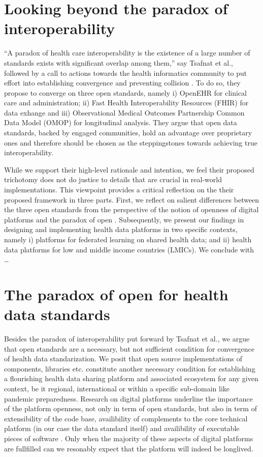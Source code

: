 \documentclass[
  authoryear]{elsarticle}
\begin{document}
\section{Looking beyond the paradox of
interoperability}\label{looking-beyond-the-paradox-of-interoperability}

``A paradox of health care interoperability is the existence of a large
number of standards exists with significant overlap among them,'' say
Tsafnat et al., followed by a call to actions towards the health
informatics community to put effort into establishing convergence and
preventing collision \citep{tsafnat2024converge}. To do so, they propose
to converge on three open standards, namely i) OpenEHR for clinical care
and administration; ii) Fast Health Interoperability Resources (FHIR)
for data exhange and iii) Observational Medical Outcomes Partnership
Common Data Model (OMOP) for longitudinal analysis. They argue that open
data standards, backed by engaged communities, hold an advantage over
proprietary ones and therefore should be chosen as the steppingstones
towards achieving true interoperability.

While we support their high-level rationale and intention, we feel their
proposed trichotomy does not do justice to details that are crucial in
real-world implementations. This viewpoint provides a critical
reflection on the their proposed framework in three parts. First, we
reflect on salient differences between the three open standards from the
perspective of the notion of openness of digital platforms
\citep{dereuver2018digital} and the paradox of open
\citep{keller2021paradox}. Subsequently, we present our findings in
designing and implementing health data platforms in two specific
contexts, namely i) platforms for federated learning on shared health
data; and ii) health data platforms for low and middle income countries
(LMICs). We conclude with \ldots{}

\section{The paradox of open for health data
standards}\label{the-paradox-of-open-for-health-data-standards}

Besides the paradox of interoperability put forward by Tsafnat et al.,
we argue that open standards are a necessary, but not sufficient
condition for convergence of health data standarization. We posit that
open source implementations of components, libraries etc. constitute
another necessary condition for establishing a flourishing health data
sharing platform and associated ecosystem for any given context, be it
regional, international or within a specific sub-domain like pandemic
preparedness. Research on digital platforms underline the importance of
the platform openness, not only in term of open standards, but also in
term of extensibility of the code base, availibility of complements to
the core technical platform (in our case the data standard itself) and
availibility of executable pieces of software
\citep{dereuver2018digital}. Only when the majority of these aspects of
digital platforms are fullfilled can we resonably expect that the
platform will indeed be longlived.
\end{document}
